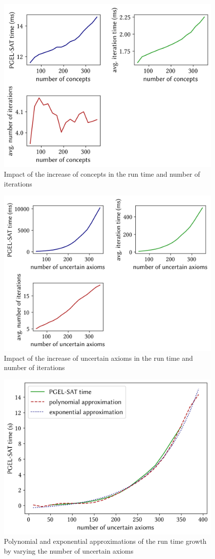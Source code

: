 \begin{figure}[ht]
  \centering
  \includegraphics[width=.75\textwidth]{../img/plot-comp1-1}
  \caption{Impact of the increase of concepts in the run time and number of iterations}
  \label{fig:plot-comp-2}
\end{figure}

\begin{figure}[ht]
  \centering
  \includegraphics[width=.75\textwidth]{../img/plot-comp1-2}
  \caption{Impact of the increase of uncertain axioms in the run time and number of iterations}
  \label{fig:plot-comp-3}
\end{figure}

\begin{figure}[ht]
  \centering
  \includegraphics[width=.75\textwidth]{../img/plot-comp2}
  \caption{Polynomial and exponential approximations of the run time growth by varying the number of uncertain axioms}
  \label{fig:plot-comp-prob}
\end{figure}

